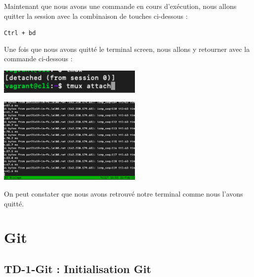 \documentclass[12pt]{article}
\begin{document}
\vspace{0.3cm}

Maintenant que nous avons une commande en cours d'exécution, nous allons quitter la session avec la combinaison de touches ci-dessous :

\texttt{Ctrl + bd}

\newpage

\vspace{0.3cm}

Une fois que nous avons quitté le terminal screen, nous allons y retourner avec la commande ci-dessous : 

\vspace{0.3cm}

\begin{center}
  \includegraphics[width=7cm]{Images-Client-SSH/Image-TD-SSH-9/tmux-attach.png}
\end{center}

\vspace{0.3cm}

\begin{center}
  \includegraphics[width=7cm]{Images-Client-SSH/Image-TD-SSH-9/return-tmux.png}
\end{center}

\vspace{0.3cm}

On peut constater que nous avons retrouvé notre terminal comme nous l'avons quitté.



\newpage

\section{Git}

\subsection{TD-1-Git : Initialisation Git}
\end{document}
